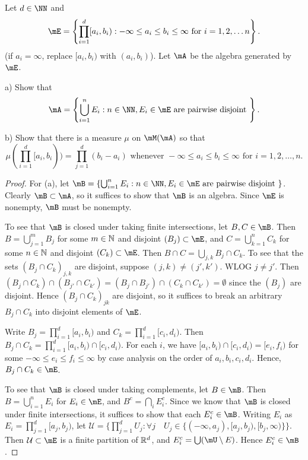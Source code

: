 \documentclass{article}
\begin{document}
 Let $d \in \NN$ and 
$$\mE = \left\{ \prod_{i=1}^d [a_i, b_i) : -\infty \le a_i \le b_i \le \infty \text{ for } i = 1,2, \ldots n \right\}.$$
(if $a_i = \infty$, replace $[a_i, b_i)$ with $(a_i, b_i)$). Let $\mA$ be the algebra generated by $\mE$.

a) Show that 
$$\mA = \left\{ \bigcup_{i=1}^n E_i : n\in \NN, E_i \in \mE \text{ are pairwise disjoint } \right\}.$$

b) Show that there is a measure $\mu$ on $\mM(\mA)$ so that 
$$\mu(\prod_{i=1}^d [a_i, b_i)) = \prod_{j=1}^d (b_i - a_i) \text{ whenever } -\infty \le a_i \le b_i \le \infty \text{ for } i = 1,2, \ldots, n.$$

\begin{proof}
For (a), let $\mB = \left\{ \bigcup_{i=1}^n E_i : n\in \NN, E_i \in \mE \text{ are pairwise disjoint } \right\}$. Clearly $\mB \subset \mA$, so it suffices to show that $\mB$ is an algebra. Since $\mE$ is nonempty, $\mB$ must be nonempty.

To see that $\mB$ is closed under taking finite intersections, let $B,C \in \mB$. Then $B = \bigcup_{j=1}^m B_j$ for some $m \in \mathbb{N}$ and disjoint $(B_j) \subset \mE$, and $C = \bigcup_{k=1}^n C_k$ for some $n \in \mathbb{N}$ and disjoint $(C_k) \subset \mE$. Then $B \cap C = \bigcup_{j,k} B_j \cap C_k$. To see that the sets $(B_j \cap C_k)_{j,k}$ are disjoint, suppose $(j,k) \neq (j',k')$. WLOG $j \neq j'$. Then $(B_j \cap C_k) \cap (B_{j'} \cap C_{k'}) = (B_j \cap B_{j'}) \cap (C_k \cap C_{k'}) = \emptyset$ since the $(B_j)$ are disjoint. Hence $(B_j \cap C_k)_{jk}$ are disjoint, so it suffices to break an arbitrary $B_j \cap C_k$ into disjoint elements of $\mE$.

Write $B_j = \prod_{i=1}^d [a_i, b_i)$ and $C_k = \prod_{i=1}^d [c_i, d_i)$. Then $B_j \cap C_k = \prod_{i=1}^d [a_i, b_i) \cap [c_i, d_i)$. For each $i$, we have $[a_i, b_i) \cap [c_i, d_i) = [e_i, f_i)$ for some $-\infty \le e_i \le f_i \le \infty$ by case analysis on the order of $a_i, b_i, c_i, d_i$. Hence, $B_j \cap C_k \in \mE$.

To see that $\mB$ is closed under taking complements, let $B \in \mB$. Then $B = \bigcup_{i=1}^n E_i$ for $E_i \in \mE$, and $B^c = \bigcap_i E_i^c$. Since we know that $\mB$ is closed under finite intersections, it suffices to show that each $E_i^c \in \mB$. Writing $E_i$ as $E_i = \prod_{j=1}^d [a_j, b_j)$, let $\mathcal U = \{\prod_{j=1}^d U_j : \forall j \quad U_j \in \{ (-\infty, a_j), [a_j, b_j), [b_j,\infty) \} \}$. Then $\mathcal U \subset \mE$ is a finite partition of $\mathbb{R}^d$, and $E_i^c = \bigcup (\mU \setminus E)$. Hence $E_i^c \in \mB$.


\end{proof}
\end{document}
